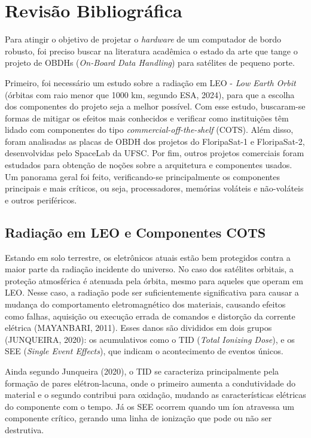\chapter{Revisão Bibliográfica}

Para atingir o objetivo de projetar o \textit{hardware} de um computador de bordo robusto, foi preciso buscar na literatura acadêmica o estado da arte que tange o projeto de OBDHs (\textit{On-Board Data Handling}) para satélites de pequeno porte. 
 
Primeiro, foi necessário um estudo sobre a radiação em LEO - \textit{Low Earth Orbit} (órbitas com raio menor que 1000 km, segundo ESA, 2024), para que a escolha dos componentes do projeto seja a melhor possível. Com esse estudo, buscaram-se formas de mitigar os efeitos mais conhecidos e verificar como instituições têm lidado com componentes do tipo \textit{commercial-off-the-shelf} (COTS). Além disso, foram analisadas as placas de OBDH dos projetos do FloripaSat-1 e FloripaSat-2, desenvolvidas pelo SpaceLab da UFSC. Por fim, outros projetos comerciais foram estudados para obtenção de noções sobre a arquitetura e componentes usados. Um panorama geral foi feito, verificando-se principalmente os componentes principais e mais críticos, ou seja, processadores, memórias voláteis e não-voláteis e outros periféricos.

\section{Radiação em LEO e Componentes COTS}

Estando em solo terrestre, os eletrônicos atuais estão bem protegidos contra a maior parte da radiação incidente do universo. No caso dos satélites orbitais, a proteção atmosférica é atenuada pela órbita, mesmo para aqueles que operam em LEO. Nesse caso, a radiação pode ser suficientemente significativa para causar a mudança do comportamento eletromagnético dos materiais, causando efeitos como falhas, aquisição ou execução errada de comandos e distorção da corrente elétrica (MAYANBARI, 2011).  Esses danos são divididos em dois grupos (JUNQUEIRA, 2020): os acumulativos como o TID (\textit{Total Ionizing Dose}), e os SEE (\textit{Single Event Effects}), que indicam o acontecimento de eventos únicos. 

Ainda segundo Junqueira (2020), o TID se caracteriza principalmente pela formação de pares elétron-lacuna, onde o primeiro aumenta a condutividade do material e o segundo contribui para oxidação, mudando as características elétricas do componente com o tempo.  Já os SEE ocorrem quando um íon atravessa um componente crítico, gerando uma linha de ionização que pode ou não ser destrutiva. 

